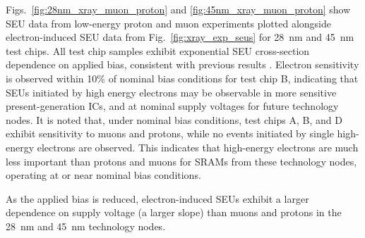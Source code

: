 Figs.~\ref{fig:28nm_xray_muon_proton} and \ref{fig:45nm_xray_muon_proton} show SEU data from low-energy proton and muon experiments plotted alongside electron-induced SEU data from Fig.~\ref{fig:xray_exp_seus} for 28~nm and 45~nm test chips. 
All test chip samples exhibit exponential SEU cross-section dependence on applied bias, consistent with previous results \cite{Rodbell:2007vl, Sierawski:2010cj}. 
Electron sensitivity is observed within 10\% of nominal bias conditions for test chip B, indicating that SEUs initiated by high energy electrons may be observable in more sensitive present-generation ICs, and at nominal supply voltages for future technology nodes.
It is noted that, under nominal bias conditions, test chips A, B, and D exhibit sensitivity to muons and protons, while no events initiated by single high-energy electrons are observed. 
This indicates that high-energy electrons are much less important than protons and muons for SRAMs from these technology nodes, operating at or near nominal bias conditions.

As the applied bias is reduced, electron-induced SEUs exhibit a larger dependence on supply voltage (a larger slope) than muons and protons in the 28~nm and 45~nm technology nodes.

